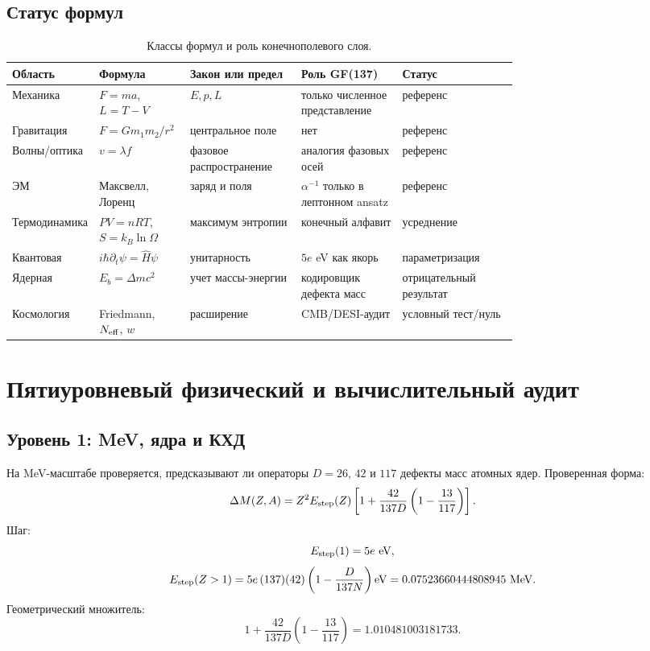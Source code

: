 \documentclass[11pt]{article}
\begin{document}
\subsection{Статус формул}

\begin{table}[h]
\centering
\scriptsize
\caption{Классы формул и роль конечнополевого слоя.}
\setlength{\tabcolsep}{3pt}
\begin{tabularx}{\linewidth}{@{}P{0.13\linewidth}P{0.18\linewidth}P{0.22\linewidth}P{0.20\linewidth}Y@{}}
\toprule
Область & Формула & Закон или предел & Роль GF(137) & Статус \\
\midrule
Механика & $F=ma$, $L=T-V$ & $E,p,L$ & только численное представление & референс \\
Гравитация & $F=Gm_1m_2/r^2$ & центральное поле & нет & референс \\
Волны/оптика & $v=\lambda f$ & фазовое распространение & аналогия фазовых осей & референс \\
ЭМ & Максвелл, Лоренц & заряд и поля & $\alpha^{-1}$ только в лептонном ansatz & референс \\
Термодинамика & $PV=nRT$, $S=k_B\ln\Omega$ & максимум энтропии & конечный алфавит & усреднение \\
Квантовая & $i\hbar\partial_t\psi=\hat{H}\psi$ & унитарность & $5e$ eV как якорь & параметризация \\
Ядерная & $E_b=\Delta mc^2$ & учет массы-энергии & кодировщик дефекта масс & отрицательный результат \\
Космология & Friedmann, $N_{\rm eff}$, $w$ & расширение & CMB/DESI-аудит & условный тест/нуль \\
\bottomrule
\end{tabularx}
\end{table}

\section{Пятиуровневый физический и вычислительный аудит}

\subsection{Уровень 1: MeV, ядра и КХД}

На MeV-масштабе проверяется, предсказывают ли операторы $D=26$, $42$ и $117$
дефекты масс атомных ядер.  Проверенная форма:
\begin{equation}
    \Delta M(Z,A)
    =
    Z^2E_{\rm step}(Z)
    \left[
        1+\frac{42}{137D}\left(1-\frac{13}{117}\right)
    \right].
\end{equation}
Шаг:
\begin{equation}
    E_{\rm step}(1)=5e~{\rm eV},
\end{equation}
\begin{equation}
    E_{\rm step}(Z>1)
    =
    5e\,(137)(42)
    \left(1-\frac{D}{137N}\right){\rm eV}
    =
    0.07523660444808945~{\rm MeV}.
\end{equation}
Геометрический множитель:
\begin{equation}
    1+\frac{42}{137D}\left(1-\frac{13}{117}\right)
    =
    1.010481003181733.
\end{equation}
\end{document}
